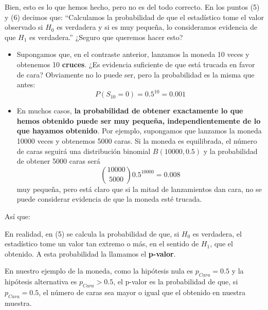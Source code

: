 \documentclass[
  spanish,
  letterpaper,
  DIV=11,
  numbers=noendperiod]{scrreprt}
\begin{document}
Bien, esto es lo que hemos hecho, pero no es del todo correcto. En los
puntos (5) y (6) decimos que: ``Calculamos la probabilidad de que el
estadístico tome el valor observado si \(H_0\) es verdadera y si es muy
pequeña, lo consideramos evidencia de que \(H_1\) es verdadera.''
¿Seguro que queremos hacer esto?

\begin{itemize}
\item
  Supongamos que, en el contraste anterior, lanzamos la moneda 10 veces
  y obtenemos 10 \textbf{cruces}. ¿Es evidencia suficiente de que está
  trucada en favor de cara? Obviamente no lo puede ser, pero la
  probabilidad es la misma que antes: \[
  P(S_{10}=0)=0.5^{10}=0.001
  \]
\item
  En muchos casos, \textbf{la probabilidad de obtener exactamente lo que
  hemos obtenido puede ser muy pequeña, independientemente de lo que
  hayamos obtenido}. Por ejemplo, supongamos que lanzamos la moneda
  10000 veces y obtenemos 5000 caras. Si la moneda es equilibrada, el
  número de caras seguirá una distribución binomial \(B(10000,0.5)\) y
  la probabilidad de obtener 5000 caras será \[
  \binom{10000}{5000}0.5^{10000}=0.008
  \] muy pequeña, pero está claro que si la mitad de lanzamientos dan
  cara, no se puede considerar evidencia de que la moneda esté trucada.
\end{itemize}

Así que:

\begin{tcolorbox}[enhanced jigsaw, arc=.35mm, bottomrule=.15mm, bottomtitle=1mm, breakable, colback=white, colbacktitle=quarto-callout-important-color!10!white, colframe=quarto-callout-important-color-frame, coltitle=black, left=2mm, leftrule=.75mm, opacityback=0, opacitybacktitle=0.6, rightrule=.15mm, title=\textcolor{quarto-callout-important-color}{\faExclamation}\hspace{0.5em}{Importante}, titlerule=0mm, toprule=.15mm, toptitle=1mm]

En realidad, en (5) se calcula la probabilidad de que, si \(H_0\) es
verdadera, el estadístico tome un valor tan extremo o más, en el sentido
de \(H_1\), que el obtenido. A esta probabilidad la llamamos el
\textbf{p-valor}.

\end{tcolorbox}

En nuestro ejemplo de la moneda, como la hipótesis nula es
\(p_{\mathit{Cara}}= 0.5\) y la hipótesis alternativa es
\(p_{\mathit{Cara}}> 0.5\), el p-valor es la probabilidad de que, si
\(p_{\mathit{Cara}}= 0.5\), el número de caras sea mayor o igual que el
obtenido en nuestra muestra.
\end{document}

